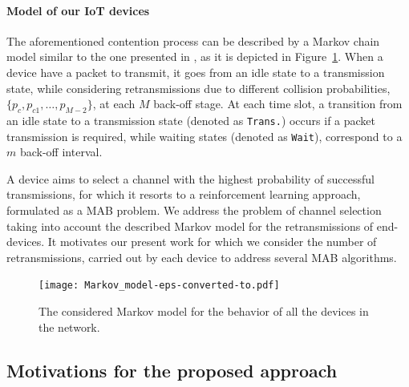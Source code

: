 \paragraph{Model of our IoT devices}

The aforementioned contention process can be described by a Markov chain model \cite{Norris98} similar to the one presented in \cite{Yang12}, as it is depicted in Figure~\ref{fig:43:Markov_model}.
When a device have a packet to transmit, it goes from an idle state to a transmission state, while considering retransmissions due to different collision probabilities, $\{p_{c}, p_{c1}, \dots, p_{M-2} \}$, at each $M$ back-off stage.
At each time slot, a transition from an idle state to a transmission state (denoted as \texttt{Trans.}) occurs if a packet transmission is required, while waiting states (denoted as \texttt{Wait}), correspond to a $m$ back-off interval.

A device aims to select a channel with the highest probability of successful transmissions, for which it resorts to a reinforcement learning approach, formulated as a MAB problem.
%
We address the problem of channel selection taking into account the described Markov model for the retransmissions of end-devices.
It motivates our present work for which we consider the number of retransmissions, carried out by each device to address several MAB algorithms.

\begin{figure}[htp!]  %
	\centering
	\texttt{[image: Markov\_model-eps-converted-to.pdf]}
	\caption{The considered Markov model for the behavior of all the devices in the network.}
	\label{fig:43:Markov_model}
\end{figure}
%

\subsection{Motivations for the proposed approach}
\label{sub:43:motivations}

